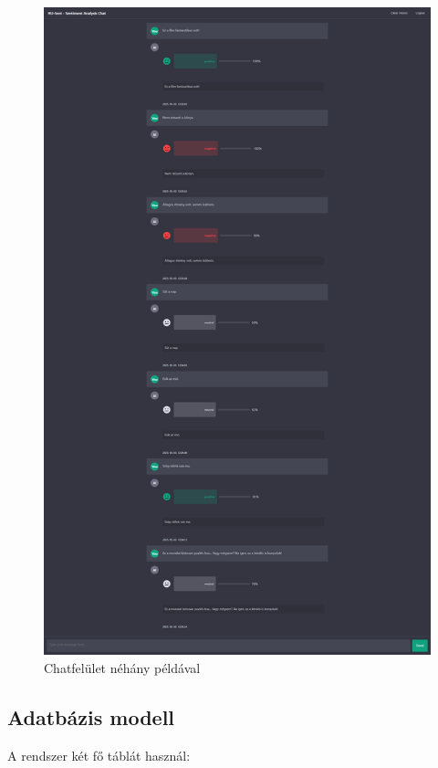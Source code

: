 \documentclass[12pt]{article}
\begin{document}
\begin{figure}[H]
    \centering
    \includegraphics[width=\linewidth,height=0.95\textheight,keepaspectratio]{images/04_chat.png}
    \caption{Chatfelület néhány példával}
    \label{fig:04_chat}
\end{figure}

\subsection{Adatbázis modell}

A rendszer két fő táblát használ:
\end{document}
